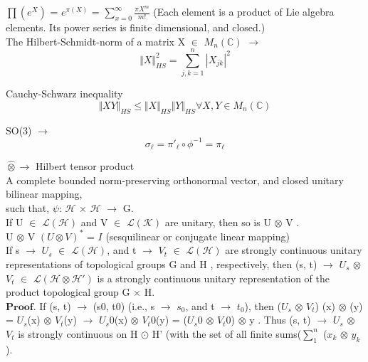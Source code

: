 \documentclass[a4paper, 10pt, onepage]{elegantbook}
\begin{document}
\begin{note}
$\prod (e^X)$ = $e^{\pi (X)}$ = $ \sum_{x=0}^\infty \frac{\pi X^m}{m!}$ (Each element is a product of Lie algebra elements. Its power series is finite dimensional, and closed.)  \\
                                                                  
The Hilbert-Schmidt-norm of a matrix X $\in$ $M_n(\mathbb C)$ $\longrightarrow$  \\
\begin{equation} 
\Vert X \Vert^2_{HS} = \sum_{j,k = 1}^{n} |X_{jk}|^2  
\end{equation}
  
Cauchy-Schwarz inequality 
\begin{equation}
\Vert {XY} \Vert_{HS} \leq \Vert X \Vert_{HS} \Vert Y \Vert_{HS} \forall X,Y \in M_n(\mathbb C) 
\end{equation}

SO(3) $\longrightarrow$
\begin{equation} 
\sigma_{\ell} = \pi'_{\ell} \circ \phi^{-1} = \pi_\ell
\end{equation}

$\hat \otimes \longrightarrow$ Hilbert tensor product \\

A complete bounded norm-preserving orthonormal vector, and closed unitary bilinear mapping,  \\
such that, $\psi$: $\mathscr H$ $\times$ $\mathscr H$ $\rightarrow$ G.  \\

If U $\in$ $\mathscr L (\mathscr H)$ and V $\in$ $\mathscr L (\mathscr K)$ are unitary, then so is U $\otimes$ V .  \\

U $\otimes$ V $(U \otimes V )^*$ = $I$ (sesquilinear or conjugate linear mapping)  \\

If s $\rightarrow$ $U_s$ $\in$ $\mathscr L (\mathscr H)$, and t $\rightarrow$ $V_t$ $\in$ $\mathscr L (\mathscr H)$ are strongly continuous unitary representations of topological groups G and H , respectively, then (s, t) $\rightarrow$ $U_s$ $\otimes$ $V_t$ $\in$ $\mathscr L (\mathscr H \otimes \mathscr H')$ is a strongly continuous unitary representation of the product topological group G $\times$ H.  \\

$\mathbf{\textbf{Proof}}$. If (s, t) $\rightarrow$ (s0, t0) (i.e., s $\rightarrow$  $s_0$, and t $\rightarrow$ $t_0$), then ($U_s$ $\otimes$ $V_t$) (x) $\otimes$ (y) = $U_s$(x) $\otimes$ $V_t$(y) $\rightarrow$ $U_s0$(x) $\otimes$ $V_t0$(y) = ($U_s0$ $\otimes$ $V_t0$)  $\otimes$ y . Thus (s, t) $\rightarrow$ $U_s$ $\otimes$ $V_t$ is strongly continuous on H $\odot$ H' (with the set of all finite sums($\sum_{1}^n$ ($x_k$ $\otimes$ $y_k$).  \\


\end{note}
\end{document}
